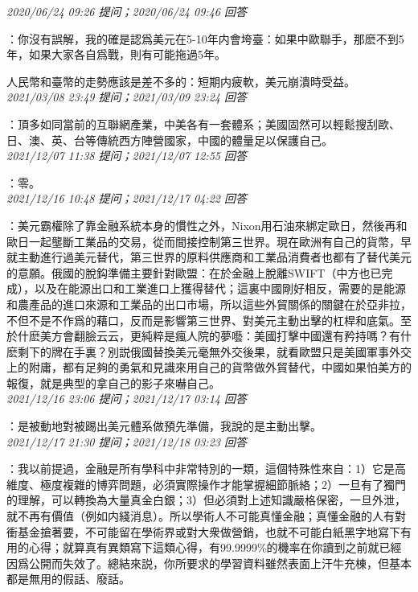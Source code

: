 \documentclass[twocolumn]{ctexart}
\begin{document}
\textit{\hfill\noindent\small 2020/06/24 09:26 提问；2020/06/24 09:46 回答}

：你沒有誤解，我的確是認爲美元在5-10年内會垮臺：如果中歐聯手，那麽不到5年，如果大家各自爲戰，則有可能拖過5年。

人民幣和臺幣的走勢應該是差不多的：短期内疲軟，美元崩潰時受益。
\\

\textit{\hfill\noindent\small 2021/03/08 23:49 提问；2021/03/09 23:24 回答}

：頂多如同當前的互聯網產業，中美各有一套體系；美國固然可以輕鬆搜刮歐、日、澳、英、台等傳統西方陣營國家，中國的體量足以保護自己。
\\

\textit{\hfill\noindent\small 2021/12/07 11:38 提问；2021/12/07 12:55 回答}

：零。
\\

\textit{\hfill\noindent\small 2021/12/16 10:48 提问；2021/12/17 04:22 回答}

：美元霸權除了靠金融系統本身的慣性之外，Nixon用石油來綁定歐日，然後再和歐日一起壟斷工業品的交易，從而間接控制第三世界。現在歐洲有自己的貨幣，早就主動進行過美元替代，第三世界的原料供應商和工業品消費者也都有了替代美元的意願。俄國的脫鈎準備主要針對歐盟：在於金融上脫離SWIFT（中方也已完成），以及在能源出口和工業進口上獲得替代；這裏中國剛好相反，需要的是能源和農產品的進口來源和工業品的出口市場，所以這些外貿關係的關鍵在於亞非拉，不但不是不作爲的藉口，反而是影響第三世界、對美元主動出擊的杠桿和底氣。至於什麽美方會翻臉云云，更純粹是瘋人院的夢囈：美國打擊中國還有矜持嗎？有什麽剩下的牌在手裏？別説俄國替換美元毫無外交後果，就看歐盟只是美國軍事外交上的附庸，都有足夠的勇氣和見識來用自己的貨幣做外貿替代，中國如果怕美方的報復，就是典型的拿自己的影子來嚇自己。
\\

\textit{\hfill\noindent\small 2021/12/16 23:06 提问；2021/12/17 03:14 回答}

：是被動地對被踢出美元體系做預先準備，我說的是主動出擊。
\\

\textit{\hfill\noindent\small 2021/12/17 21:30 提问；2021/12/18 03:23 回答}

：我以前提過，金融是所有學科中非常特別的一類，這個特殊性來自：1）它是高維度、極度複雜的博弈問題，必須實際操作才能掌握細節脈絡；2）一旦有了獨門的理解，可以轉換為大量真金白銀；3）但必須對上述知識嚴格保密，一旦外泄，就不再有價值（例如内綫消息）。所以學術人不可能真懂金融；真懂金融的人有對衝基金搶著要，不可能留在學術界或對大衆做營銷，也就不可能白紙黑字地寫下有用的心得；就算真有異類寫下這類心得，有99.9999\%的機率在你讀到之前就已經因爲公開而失效了。總結來説，你所要求的學習資料雖然表面上汗牛充棟，但基本都是無用的假話、廢話。
\end{document}
